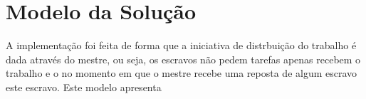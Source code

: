 \section{Modelo da Solução}

	A implementação foi feita de forma que a iniciativa de distrbuição do trabalho é dada através do mestre, ou seja, os escravos não pedem tarefas apenas recebem o trabalho e o no momento em que o mestre recebe uma reposta de algum escravo este escravo. Este modelo apresenta 
	
    